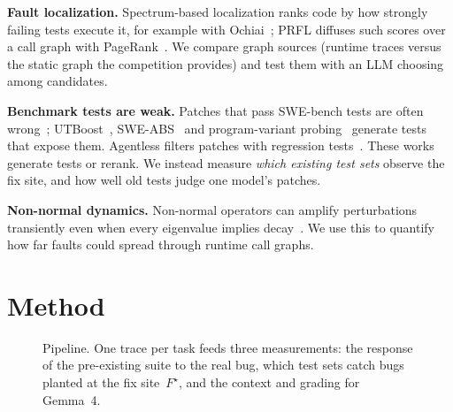 \documentclass[conference]{IEEEtran}
\newcommand{\Fs}{F^{\star}}
\begin{document}
\textbf{Fault localization.} Spectrum-based localization ranks code by how strongly failing tests execute it, for example with Ochiai~\cite{abreu2007accuracy}; PRFL diffuses such scores over a call graph with PageRank~\cite{zhang2017prfl}. We compare graph sources (runtime traces versus the static graph the competition provides) and test them with an LLM choosing among candidates.

\textbf{Benchmark tests are weak.} Patches that pass SWE-bench tests are often wrong~\cite{wang2026solved}; UTBoost~\cite{yu2025utboost}, SWE-ABS~\cite{yu2026sweabs} and program-variant probing~\cite{li2026probe} generate tests that expose them. Agentless filters patches with regression tests~\cite{xia2024agentless}. These works generate tests or rerank. We instead measure \emph{which existing test sets} observe the fix site, and how well old tests judge one model's patches.

\textbf{Non-normal dynamics.} Non-normal operators can amplify perturbations transiently even when every eigenvalue implies decay~\cite{trefethen2005spectra,asllani2018nonnormal}. We use this to quantify how far faults could spread through runtime call graphs.

\section{Method}
\begin{figure}[t]
\centering
{}
\caption{Pipeline. One trace per task feeds three measurements: the response of the pre-existing suite to the real bug, which test sets catch bugs planted at the fix site~$\Fs$, and the context and grading for Gemma~4.}
\label{fig:pipeline}
\end{figure}
\end{document}
